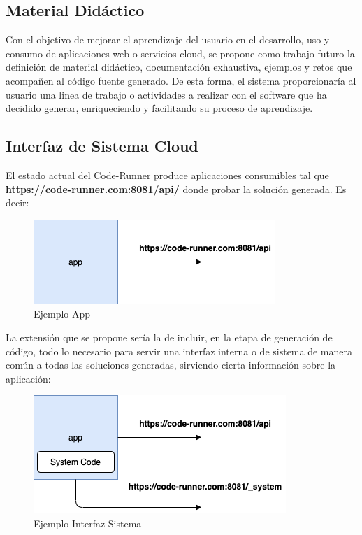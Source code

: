 \documentclass[a4paper,11pt]{book}
\begin{document}
\subsection{Material Didáctico}

Con el objetivo de mejorar el aprendizaje del usuario en el desarrollo, uso y consumo de aplicaciones web o servicios cloud, se propone como trabajo futuro la definición de material didáctico, documentación exhaustiva, ejemplos y retos que acompañen al código fuente generado. De esta forma, el sistema proporcionaría al usuario una linea de trabajo o actividades a realizar con el software que ha decidido generar, enriqueciendo y facilitando su proceso de aprendizaje. 

\subsection{Interfaz de Sistema Cloud}


El estado actual del Code-Runner produce aplicaciones consumibles tal que  \textbf{ https://code-runner.com:8081/api/}  donde probar la solución generada. Es decir: 

   \begin{figure}[H]
\centering
\includegraphics[scale=0.5]{imagenes/api.png}
\caption{ Ejemplo App  }
\end{figure}
La extensión que se propone sería la de incluir, en la etapa de generación de código, todo lo necesario para servir una interfaz interna o de sistema de manera común a todas las soluciones generadas, sirviendo  cierta información sobre la aplicación:


   \begin{figure}[H]
\centering
\includegraphics[scale=0.5]{imagenes/system.png}
\caption{ Ejemplo Interfaz Sistema  }
\end{figure}
\end{document}
